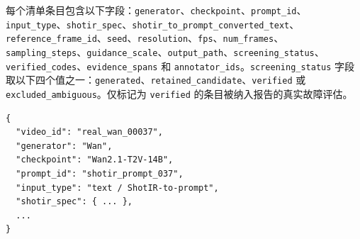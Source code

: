 \documentclass{article}
\begin{document}
每个清单条目包含以下字段：\texttt{generator}、\texttt{checkpoint}、\texttt{prompt\_id}、\texttt{input\_type}、\texttt{shotir\_spec}、\texttt{shotir\_to\_prompt\_converted\_text}、\texttt{reference\_frame\_id}、\texttt{seed}、\texttt{resolution}、\texttt{fps}、\texttt{num\_frames}、\texttt{sampling\_steps}、\texttt{guidance\_scale}、\texttt{output\_path}、\texttt{screening\_status}、\texttt{verified\_codes}、\texttt{evidence\_spans} 和 \texttt{annotator\_ids}。\texttt{screening\_status} 字段取以下四个值之一：\texttt{generated}、\texttt{retained\_candidate}、\texttt{verified} 或 \texttt{excluded\_ambiguous}。仅标记为 \texttt{verified} 的条目被纳入报告的真实故障评估。

\begin{verbatim}
{
  "video_id": "real_wan_00037",
  "generator": "Wan",
  "checkpoint": "Wan2.1-T2V-14B",
  "prompt_id": "shotir_prompt_037",
  "input_type": "text / ShotIR-to-prompt",
  "shotir_spec": { ... },
  ...
}
\end{verbatim}
\end{document}
